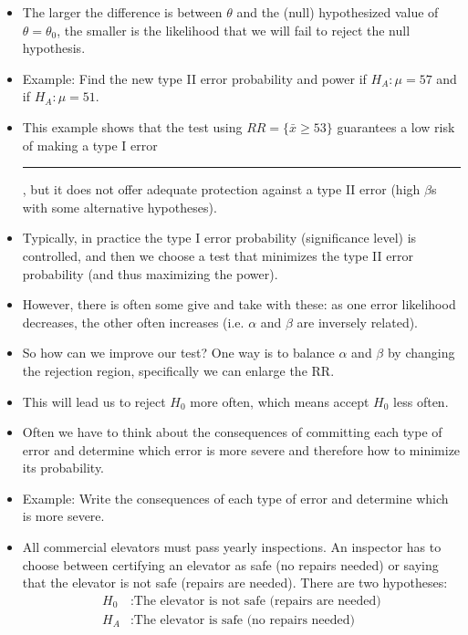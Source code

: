 \documentclass{article}
\newcommand{\blankul}[1]{\rule[-1.5mm]{#1}{0.15mm}}	%
\newcommand{\ho}{H_0}		%
\newcommand{\ha}{H_A}		%
\begin{document}
\begin{itemize}
    \item[] The larger the difference is between $\theta$ and the (null) hypothesized value of $\theta = \theta_0$, the smaller is the likelihood that we will fail to reject the null hypothesis.
    \item[] Example: Find the new type II error probability and power if $\ha: \mu = 57$ and if $\ha: \mu = 51$.\vspace{60pt}
    \item This example shows that the test using $RR = \{\bar{x} \ge 53\}$ guarantees a low risk of making a type I error \blankul{2cm}, but it does not offer adequate protection against a type II error (high $\beta$s with some alternative hypotheses).
    \item Typically, in practice the type I error probability (significance level) is controlled, and then we choose a test that minimizes the type II error probability (and thus maximizing the power).
    \item[] However, there is often some give and take with these: as one error likelihood decreases, the other often increases (i.e. $\alpha$ and $\beta$ are inversely related).
    \item So how can we improve our test? One way is to balance $\alpha$ and $\beta$ by changing the rejection region, specifically we can enlarge the RR.
    \item[] This will lead us to reject $\ho$ more often, which means accept $\ho$ less often.\vspace{30pt}
    \item Often we have to think about the consequences of committing each type of error and determine which error is more severe and therefore how to minimize its probability.
    \item Example: Write the consequences of each type of error and determine which is more severe.
    \item[] All commercial elevators must pass yearly inspections. An inspector has to choose between certifying an elevator as safe (no repairs needed) or saying that the elevator is not safe (repairs are needed). There are two hypotheses:
    \begin{align*}
        \ho &: \text{The elevator is not safe (repairs are needed)}\\
        \ha &: \text{The elevator is safe (no repairs needed)} 
    \end{align*}


\end{itemize}
\end{document}
